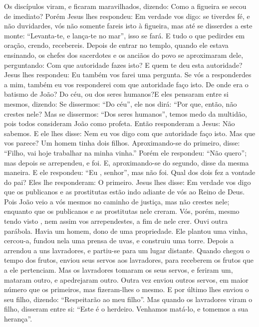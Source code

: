 {  Os discípulos viram, e ficaram maravilhados, dizendo: Como a figueira se secou de imediato?
  Porém Jesus lhes respondeu: Em verdade vos digo: se tiverdes fé, e não duvidardes, vós não somente fareis isto à figueira, mas até se disserdes a este monte: “Levanta-te, e lança-te no mar”, isso se fará.
  E tudo o que pedirdes em oração, crendo, recebereis.
  Depois de entrar no templo, quando ele estava ensinando, os chefes dos sacerdotes e os anciãos do povo se aproximaram dele, perguntando: Com que autoridade fazes isto? E quem te deu esta autoridade?
  Jesus lhes respondeu: Eu também vos farei uma pergunta. Se vós a responderdes a mim, também eu vos responderei com que autoridade faço isto.
  De onde era o batismo de João? Do céu, ou dos seres humanos?E eles pensaram entre si mesmos, dizendo: Se dissermos: “Do céu”, ele nos dirá: “Por que, então, não crestes nele?
  Mas se dissermos: “Dos seres humanos”, temos medo da multidão, pois todos consideram João como profeta.
  Então responderam a Jesus: Não sabemos. E ele lhes disse: Nem eu vos digo com que autoridade faço isto.
  Mas que vos parece? Um homem tinha dois filhos. Aproximando-se do primeiro, disse: “Filho, vai hoje trabalhar na minha vinha.”
  Porém ele respondeu: “Não quero”; mas depois se arrependeu, e foi.
  E, aproximando-se do segundo, disse da mesma maneira. E ele respondeu: “Eu
{},  senhor”, mas não foi.
  Qual dos dois fez a vontade do pai? Eles lhe responderam: O primeiro. Jesus lhes disse: Em verdade vos digo que os publicanos e as prostitutas estão indo adiante de vós ao Reino de Deus.
  Pois João veio a vós mesmos no caminho de justiça, mas não crestes nele; enquanto que os publicanos e as prostitutas nele creram. Vós, porém, mesmo tendo visto
{},  nem assim vos arrependestes, a fim de nele crer.
  Ouvi outra parábola. Havia um homem, dono de uma propriedade. Ele plantou uma vinha, cercou-a, fundou nela uma prensa de uvas, e construiu uma torre. Depois a arrendou a uns lavradores, e partiu-se para um lugar distante.
  Quando chegou o tempo dos frutos, enviou seus servos aos lavradores, para receberem os frutos que a ele pertenciam.
  Mas os lavradores tomaram os seus servos, e feriram um, mataram outro, e apedrejaram outro.
  Outra vez enviou outros servos, em maior número que os primeiros, mas fizeram-lhes o mesmo.
  E por último lhes enviou o seu filho, dizendo: “Respeitarão ao meu filho”.
  Mas quando os lavradores viram o filho, disseram entre si: “Este é o herdeiro. Venhamos matá-lo, e tomemos a sua herança”.
}

